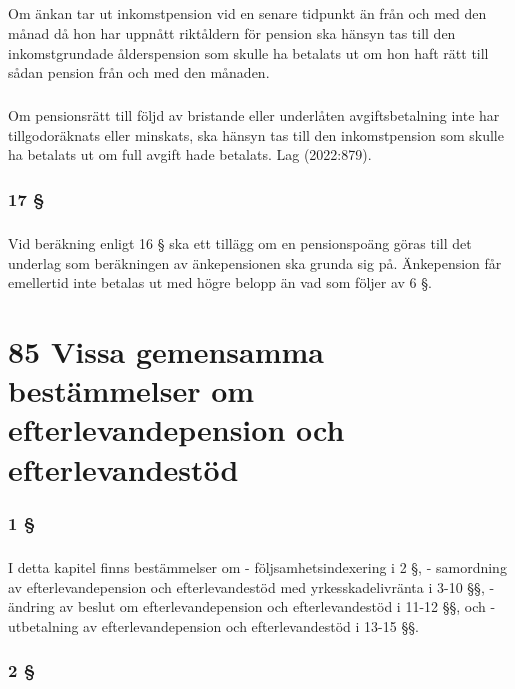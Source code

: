\documentclass[a4paper,notitlepage,openany,10pt]{book}
\begin{document}
\paragraph*{}
Om änkan tar ut inkomstpension vid en senare tidpunkt än från och med den månad då hon har uppnått riktåldern för pension ska hänsyn tas till den inkomstgrundade ålderspension som skulle ha betalats ut om hon haft rätt till sådan pension från och med den månaden.
\paragraph*{}
Om pensionsrätt till följd av bristande eller underlåten avgiftsbetalning inte har tillgodoräknats eller minskats, ska hänsyn tas till den inkomstpension som skulle ha betalats ut om full avgift hade betalats.
Lag (2022:879).
\subsection*{17 §}
\paragraph*{}
Vid beräkning enligt 16 § ska ett tillägg om en pensionspoäng göras till det underlag som beräkningen av änkepensionen ska grunda sig på. Änkepension får emellertid inte betalas ut med högre belopp än vad som följer av 6 §.
\chapter*{85 Vissa gemensamma bestämmelser om efterlevandepension och efterlevandestöd}
\subsection*{1 §}
\paragraph*{}
I detta kapitel finns bestämmelser om
\newline - följsamhetsindexering i 2 §,
\newline - samordning av efterlevandepension och efterlevandestöd med yrkesskadelivränta i 3-10 §§,
\newline - ändring av beslut om efterlevandepension och efterlevandestöd i 11-12 §§, och
\newline - utbetalning av efterlevandepension och efterlevandestöd i 13-15 §§.
\subsection*{2 §}
\end{document}
